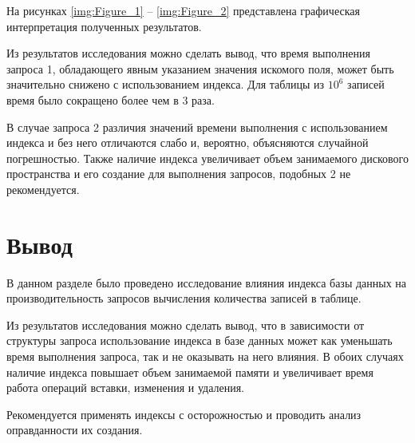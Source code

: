 \clearpage

На рисунках \ref{img:Figure_1} -- \ref{img:Figure_2} представлена графическая интерпретация полученных результатов.

\pagebreak

Из результатов исследования можно сделать вывод, что время выполнения запроса 1, обладающего явным указанием значения искомого поля, может быть значительно снижено с использованием индекса. Для таблицы из $10^6$ записей время было сокращено более чем в 3 раза. 

В случае запроса 2 различия значений времени выполнения с использованием индекса и без него отличаются слабо и, вероятно, объясняются случайной погрешностью. Также наличие индекса увеличивает объем занимаемого дискового пространства и его создание для выполнения запросов, подобных 2 не рекомендуется.





\section*{Вывод}

В данном разделе было проведено исследование влияния индекса базы данных на производительность запросов вычисления количества записей в таблице. 

Из результатов исследования можно сделать вывод, что в зависимости от структуры запроса использование индекса в базе данных может как уменьшать время выполнения запроса, так и не оказывать на него влияния. В обоих случаях наличие индекса повышает объем занимаемой памяти и увеличивает время работа операций вставки, изменения и удаления.

Рекомендуется применять индексы с осторожностью и проводить анализ оправданности их создания.


